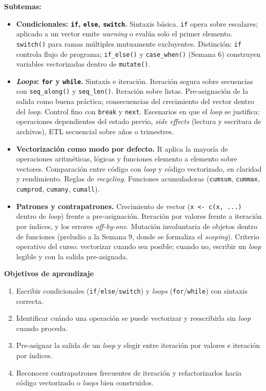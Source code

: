 \documentclass[11pt,letterpaper]{article}
\begin{document}
\textbf{Subtemas:}

\begin{itemize}[leftmargin=*, itemsep=2pt]
    \item \textbf{Condicionales: \texttt{if}, \texttt{else}, \texttt{switch}.} Sintaxis básica. \texttt{if} opera sobre escalares; aplicado a un vector emite \textit{warning} o evalúa solo el primer elemento. \texttt{switch()} para ramas múltiples mutuamente excluyentes. Distinción: \texttt{if} controla flujo de programa; \texttt{if\_else()} y \texttt{case\_when()} (Semana 6) construyen variables vectorizadas dentro de \texttt{mutate()}.
    \item \textbf{\textit{Loops}: \texttt{for} y \texttt{while}.} Sintaxis e iteración. Iteración segura sobre secuencias con \texttt{seq\_along()} y \texttt{seq\_len()}. Iteración sobre listas. Pre-asignación de la salida como buena práctica; consecuencias del crecimiento del vector dentro del \textit{loop}. Control fino con \texttt{break} y \texttt{next}. Escenarios en que el \textit{loop} se justifica: operaciones dependientes del estado previo, \textit{side effects} (lectura y escritura de archivos), ETL secuencial sobre años o trimestres.
    \item \textbf{Vectorización como modo por defecto.} R aplica la mayoría de operaciones aritméticas, lógicas y funciones elemento a elemento sobre vectores. Comparación entre código con \textit{loop} y código vectorizado, en claridad y rendimiento. Reglas de \textit{recycling}. Funciones acumuladoras (\texttt{cumsum}, \texttt{cummax}, \texttt{cumprod}, \texttt{cumany}, \texttt{cumall}).
    \item \textbf{Patrones y contrapatrones.} Crecimiento de vector (\texttt{x <- c(x, ...)} dentro de \textit{loop}) frente a pre-asignación. Iteración por valores frente a iteración por índices, y los errores \textit{off-by-one}. Mutación involuntaria de objetos dentro de funciones (preludio a la Semana 9, donde se formaliza el \textit{scoping}). Criterio operativo del curso: vectorizar cuando sea posible; cuando no, escribir un \textit{loop} legible y con la salida pre-asignada.
\end{itemize}

\medskip
\noindent\textbf{Objetivos de aprendizaje}
\begin{enumerate}[leftmargin=*, itemsep=1pt]
    \item Escribir condicionales (\texttt{if}/\texttt{else}/\texttt{switch}) y \textit{loops} (\texttt{for}/\texttt{while}) con sintaxis correcta.
    \item Identificar cuándo una operación se puede vectorizar y reescribirla sin \textit{loop} cuando proceda.
    \item Pre-asignar la salida de un \textit{loop} y elegir entre iteración por valores e iteración por índices.
    \item Reconocer contrapatrones frecuentes de iteración y refactorizarlos hacia código vectorizado o \textit{loops} bien construidos.
\end{enumerate}
\end{document}

